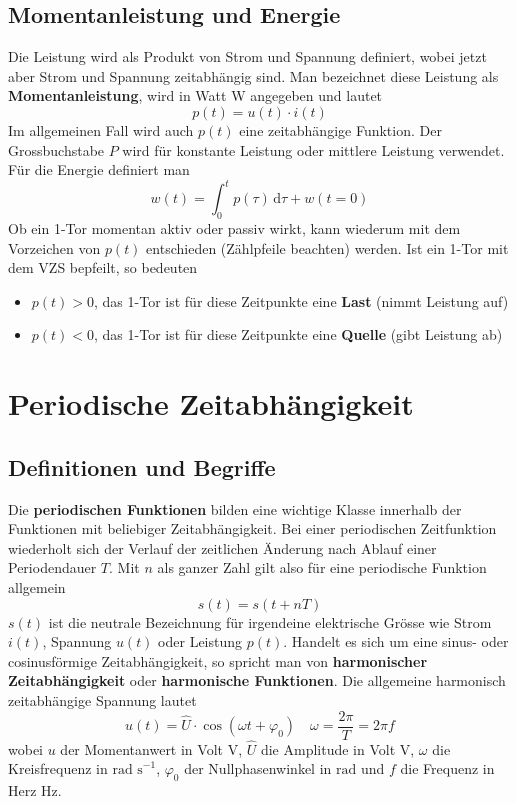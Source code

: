 \subsection{Momentanleistung und Energie}
Die Leistung wird als Produkt von Strom und Spannung definiert, wobei jetzt aber Strom und Spannung zeitabhängig sind. Man bezeichnet diese Leistung als \textbf{Momentanleistung}, wird in Watt W angegeben und lautet
\begin{equation}
\boxed{p\left(t\right)=u\left(t\right)\cdot i\left(t\right)}
\end{equation}
Im allgemeinen Fall wird auch $p\left(t\right)$ eine zeitabhängige Funktion. Der Grossbuchstabe $P$ wird für konstante Leistung oder mittlere Leistung verwendet.
\newline\newline
Für die Energie definiert man
\begin{equation}
\boxed{w\left(t\right)=\displaystyle \int_0^tp\left(\tau\right)\,\text{d}\tau+w\left(t=0\right)}
\end{equation}
Ob ein 1-Tor momentan aktiv oder passiv wirkt, kann wiederum mit dem Vorzeichen von $p\left(t\right)$ entschieden (Zählpfeile beachten) werden. Ist ein 1-Tor mit dem VZS bepfeilt, so bedeuten
\begin{itemize}
\item $p\left(t\right)>0$, das 1-Tor ist für diese Zeitpunkte eine \textbf{Last} (nimmt Leistung auf)
\item $p\left(t\right)<0$, das 1-Tor ist für diese Zeitpunkte eine \textbf{Quelle} (gibt Leistung ab)
\end{itemize}
\section{Periodische Zeitabhängigkeit}
\subsection{Definitionen und Begriffe}
Die \textbf{periodischen Funktionen} bilden eine wichtige Klasse innerhalb der Funktionen mit beliebiger Zeitabhängigkeit. Bei einer periodischen Zeitfunktion wiederholt sich der Verlauf der zeitlichen Änderung nach Ablauf einer Periodendauer $T$. Mit $n$ als ganzer Zahl gilt also für eine periodische Funktion allgemein
\begin{equation}
\boxed{s\left(t\right)=s\left(t+nT\right)}
\end{equation}
$s\left(t\right)$ ist die neutrale Bezeichnung für irgendeine elektrische Grösse wie Strom $i\left(t\right)$, Spannung $u\left(t\right)$ oder Leistung $p\left(t\right)$. Handelt es sich um eine sinus- oder cosinusförmige Zeitabhängigkeit, so spricht man von \textbf{harmonischer Zeitabhängigkeit} oder \textbf{harmonische Funktionen}. Die allgemeine harmonisch zeitabhängige Spannung lautet
\begin{equation}
\boxed{u\left(t\right)=\hat{U}\cdot \cos\left(\omega t+\varphi_0\right)}\quad \boxed{\omega=\dfrac{2\pi}{T}=2\pi f}
\end{equation}
wobei $u$ der Momentanwert in Volt V, $\hat{U}$ die Amplitude in Volt V, $\omega$ die Kreisfrequenz in $\text{rad s}^{-1}$, $\varphi_0$ der Nullphasenwinkel in $\text{rad}$ und $f$ die Frequenz in Herz Hz.
